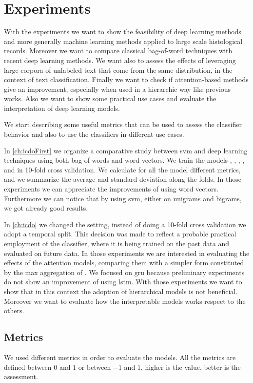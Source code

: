 \chapter{Experiments}
With the experiments we want to show the feasibility of deep learning
methods and more generally machine learning methods applied to large
scale histological records. Moreover we want to compare classical
bag-of-word techniques with recent deep learning methods. We want also
to assess the effects of leveraging large corpora of unlabeled text
that come from the same distribution, in the context of text
classification. Finally we want to check if attention-based methods
give an improvement, especially when used in a hierarchic way like
previous works. Also we want to show some practical use cases and
evaluate the interpretation of deep learning models.

We start describing some useful metrics that can be used to assess the
classifier behavior and also to use the classifiers in different use
cases.

In \cref{ch:icdoFirst} we organize a comparative study between
\ac{svm} and deep learning techniques using both bag-of-words and word
vectors. We train the models \svm, \svmb, \lstmng, \lstmc, and
\lstmb in 10-fold cross validation. We calculate for all the model
different metrics, and we summarize the average and standard deviation
along the folds. In those 
experiments we can appreciate the improvements of using word
vectors. Furthermore we can notice that by using \ac{svm}, either on
unigrams and bigrams, we got already good results.

In \ref{ch:icdo} we changed the setting, instead of doing a 10-fold
cross validation we adopt a temporal split. This decision was made to
reflect a probable practical employment of the classifier, where it is
being trained on the past data and evaluated on future data. In those
experiments we are interested in evaluating the effects of the
attention models, comparing them with a simpler form constituted by
the max aggregation of \maxp{}. We focused on \ac{gru} because
preliminary experiments do not show an improvement of using
\ac{lstm}. With those experiments we want to show that in this context
the adoption of hierarchical models is not beneficial. Moreover we
want to evaluate how the interpretable models works respect to the
others.

\section{Metrics}
We used different metrics in order to evaluate the models.
All the metrics are defined between $0$ and $1$ or between $-1$ and $1$,
higher is the value, better is the assessment.

